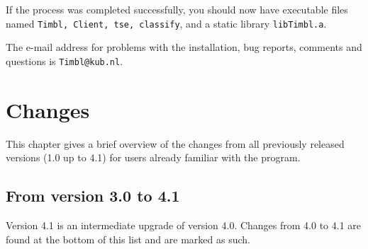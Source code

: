 \documentclass{report}
\begin{document}
If the process was completed successfully, you should now have
executable files named {\tt Timbl, Client, tse, classify}, and a
static library {\tt libTimbl.a}.

The e-mail address for problems with the installation, bug reports,
comments and questions is {\tt Timbl@kub.nl}.

\chapter{Changes}
\label{changes}

This chapter gives a brief overview of the changes from all previously
released versions (1.0 up to 4.1) for users already familiar with the
program.

\section{From version 3.0 to 4.1}

Version 4.1 is an intermediate upgrade of version 4.0. Changes
from 4.0 to 4.1 are found at the bottom of this list and are marked as such.
\end{document}

